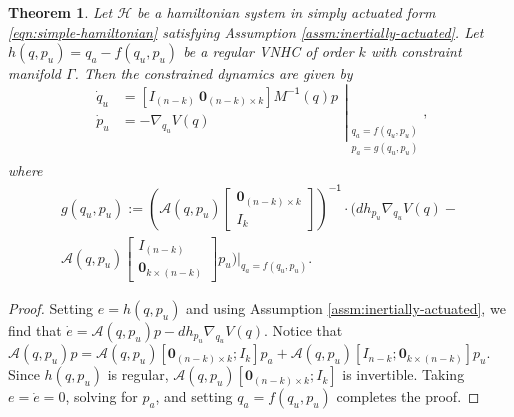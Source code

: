 \documentclass[journal,twoside,web, twocolumn,draftcls]{ieeecolor}
\newtheorem{thm}{Theorem}%
\newcommand*{\inv}{^\mathsf{-1}}
\newcommand*{\Minv}{M^\mathsf{-1}}
\newcommand*{\Id}[1]{I_{#1}}
\newcommand*{\Zmat}[1]{\bm{0}_{#1}}
\begin{document}
\begin{thm}\label{thm:zero-dynamics}
    Let \(\mathcal{H}\) be a hamiltonian system in simply actuated form
    \eqref{eqn:simple-hamiltonian} satisfying
    Assumption \ref{assm:inertially-actuated}. 
    Let \(h(q,p_u) = q_a - f(q_u,p_u)\) be a regular VNHC of order \(k\) with
    constraint manifold \(\Gamma\). 
    Then the constrained dynamics are given by
    \begin{equation}\label{eqn:qpu-dynamics}
        \left.\begin{aligned}
                \dot{q}_u &= 
                \left[\Id{(n-k)} ~ \Zmat{(n-k) \times k}\right]
                \Minv(q)p \\
            \dot{p}_u &= -\nabla_{q_u}V(q) \\
            \end{aligned}{}\right|_{\begin{array}{c}
                q_a = f(q_u,p_u) \\ 
                p_a = g(q_u,p_u) \\
            \end{array}}
            ,
    \end{equation}
    where
    \begin{multline}\label{eqn:g-qpu}
        g(q_u,p_u) := \left( \mathcal{A}(q,p_u)
        \begin{bmatrix} \Zmat{(n-k)\times k} \\ \Id{k} \end{bmatrix}\right)\inv 
        \cdot
        \Big(dh_{p_u}\nabla_{q_u}V(q) -
        \\
        \mathcal{A}(q,p_u)
        \begin{bmatrix} \Id{(n-k)} \\ \Zmat{k \times (n-k)} \end{bmatrix} p_u
        \left.\Big)\right|_{q_a = f(q_u,p_u)}
        .
    \end{multline}

\end{thm}
\begin{proof}
    Setting \(e = h(q,p_u)\) and using Assumption
    \ref{assm:inertially-actuated}, we find that
    \(\dot{e} = \mathcal{A}(q,p_u)p - dh_{p_u}\nabla_{q_u}V(q)\).
    Notice that
    \(\mathcal{A}(q,p_u)p = \mathcal{A}(q,p_u)[\Zmat{(n-k)\times k}; \Id{k}]p_a
    + \mathcal{A}(q,p_u)[\Id{n-k};\Zmat{k \times (n-k)}] p_u\).
    Since \(h(q,p_u)\) is regular,
    \(\mathcal{A}(q,p_u)[\Zmat{(n-k)\times k}; \Id{k}]\) is invertible.
    Taking \(e = \dot{e} = 0\), solving for \(p_a\), and setting 
    \(q_a = f(q_u,p_u)\) completes the proof.
\end{proof}
\end{document}
